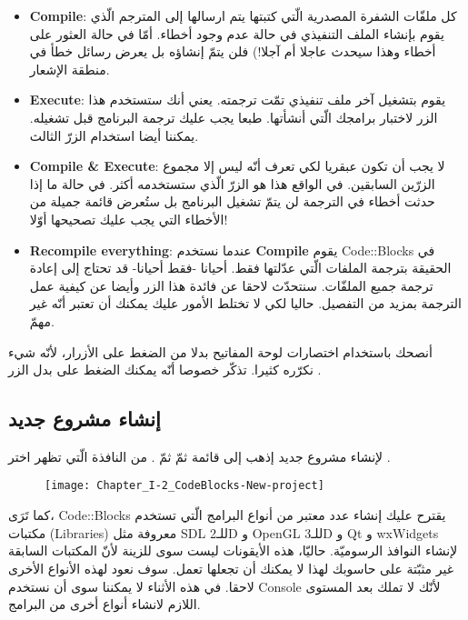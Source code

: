 \begin{itemize}
  \item \textbf{\textenglish{Compile}}:
كل ملفّات الشفرة المصدرية الّتي كتبتها يتم ارسالها إلى المترجم الّذي يقوم بإنشاء الملف التنفيذي في حالة عدم وجود أخطاء. أمّا في حالة العثور على أخطاء  وهذا سيحدث عاجلا أم آجلا!) فلن يتمّ إنشاؤه بل يعرض رسائل خطأ في منطقة الإشعار.
  \item \textbf{\textenglish{Execute}}:
يقوم بتشغيل آخر ملف تنفيذي تمّت ترجمته. يعني أنك ستستخدم هذا الزر لاختبار برامجك الّتي أنشأتها. طبعا يجب عليك ترجمة البرنامج قبل تشغيله. يمكننا أيضا استخدام الزرّ الثالث.
  \item \textbf{\textenglish{Compile \& Execute}}:
لا يجب أن تكون عبقريا لكي تعرف أنّه ليس إلا مجموع الزرّين السابقين. في الواقع هذا هو الزرّ الّذي ستستخدمه أكثر. في حالة ما إذا حدثت أخطاء في الترجمة لن يتمّ تشغيل البرنامج بل ستُعرض قائمة جميلة من الأخطاء التي يجب عليك تصحيحها أوّلا!
  \item \textbf{\textenglish{Recompile everything}}:
 عندما نستخدم
\textbf{\textenglish{Compile}}
يقوم
\textenglish{Code::Blocks}
في الحقيقة بترجمة الملفات الّتي عدّلتها فقط. أحيانا -فقط أحيانا- قد تحتاج إلى إعادة ترجمة جميع الملفّات. سنتحدّث لاحقا عن فائدة هذا الزر وأيضا عن كيفية عمل الترجمة بمزيد من التفصيل. حاليا لكي لا تختلط الأمور عليك يمكنك أن تعتبر أنّه غير مهمّ.
\end{itemize}

\begin{information}
أنصحك باستخدام اختصارات لوحة المفاتيح بدلا من الضغط على الأزرار، لأنّه شيء نكرّره كثيرا. تذكّر خصوصا أنّه يمكنك الضغط على
بدل الزر
.
\end{information}

\subsection{إنشاء مشروع جديد}

لإنشاء مشروع جديد إذهب إلى قائمة
ثمّ
ثمّ
.
من النافذة الّتي تظهر اختر
.

\begin{figure}[H]
	\centering
	\texttt{[image: Chapter\_I-2\_CodeBlocks-New-project]}
\end{figure}

\begin{information}
كما تَرَى،
\textenglish{Code::Blocks}
يقترح عليك إنشاء عدد معتبر من أنواع البرامج الّتي تستخدم مكتبات
(\textenglish{Libraries})
معروفة مثل
\textenglish{SDL}
للـ\textenglish{2D}
و
\textenglish{OpenGL}
للـ\textenglish{3D}
و
\textenglish{Qt}
و
\textenglish{wxWidgets}
لإنشاء النوافذ الرسوميّة. حاليّا، هذه الأيقونات ليست سوى للزينة لأنّ المكتبات السابقة غير مثبّتة على حاسوبك لهذا لا يمكنك أن تجعلها تعمل. سوف نعود لهذه الأنواع الأخرى لاحقا. في هذه الأثناء لا يمكننا سوى أن نستخدم \textenglish{Console}
لأنّك لا تملك بعد المستوى اللازم لانشاء أنواع أخرى من البرامج.
\end{information}

